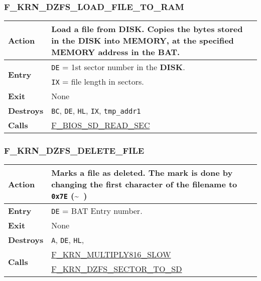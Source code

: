 \documentclass[a4paper,11pt]{article}
\begin{document}
        \subsubsection{F\_KRN\_DZFS\_LOAD\_FILE\_TO\_RAM}
        \label{func:fkrndzfsloadfiletoram}
        \begin{tabular}{l p{9cm}}
            \hline\textbf{Action}
            & Load a file from \textbf{DISK}. Copies the bytes stored in the
            \textbf{DISK} into \textbf{MEMORY}, at the specified \textbf{MEMORY}
            address in the BAT.\\
            \hline\multirow[t]{2}{4em}{\textbf{Entry}}
            & \texttt{DE} = 1st sector number in the \textbf{DISK}.\\
            & \texttt{IX} = file length in sectors.\\
            \hline\textbf{Exit} & None\\
            \hline\textbf{Destroys} & \texttt{BC}, \texttt{DE}, \texttt{HL},
            \texttt{IX}, \texttt{tmp\_addr1}\\
            \hline\textbf{Calls}
            & \hyperref[func:fbiosdiskreadsec]{F\_BIOS\_SD\_READ\_SEC}\\
            \hline
        \end{tabular}

        \subsubsection{F\_KRN\_DZFS\_DELETE\_FILE}
        \label{func:fkrndzfsdeletefile}
        \begin{tabular}{l p{9cm}}
            \hline\textbf{Action}
            & Marks a file as deleted. The mark is done by changing the first
            character of the filename to \texttt{0x7E} (\textasciitilde~)\\
            \hline\textbf{Entry}
            & \texttt{DE} = BAT Entry number.\\
            \hline\textbf{Exit} & None\\
            \hline\textbf{Destroys} & \texttt{A}, \texttt{DE}, \texttt{HL},\\
            \hline\multirow[t]{2}{4em}{\textbf{Calls}}
            & \hyperref[func:fkrnmultiply816slow]{F\_KRN\_MULTIPLY816\_SLOW}\\
            & \hyperref[func:fkrndzfssectortodisk]{F\_KRN\_DZFS\_SECTOR\_TO\_SD}\\
            \hline
        \end{tabular}
\end{document}
